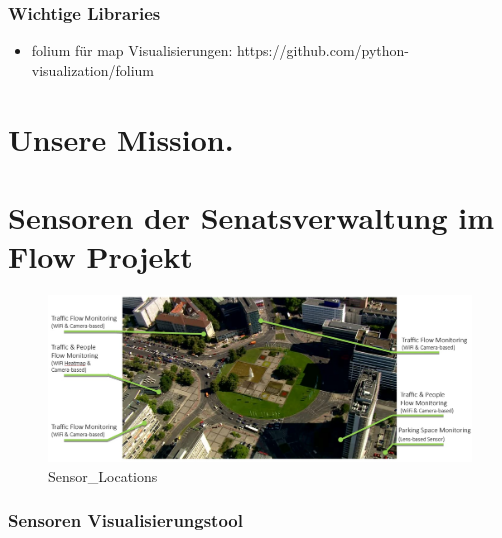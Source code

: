 \documentclass[11pt]{article}
\makeatletter
\def\maxwidth{\ifdim\Gin@nat@width>\linewidth\linewidth
    \else\Gin@nat@width\fi}
\let\Oldincludegraphics\includegraphics
\renewcommand{\includegraphics}[1]{\Oldincludegraphics[width=.8\maxwidth]{#1}}
\providecommand{\tightlist}{%
      \setlength{\itemsep}{0pt}\setlength{\parskip}{0pt}}
\makeatother
\begin{document}
    \subsubsection{Wichtige Libraries}\label{wichtige-libraries}

\begin{itemize}
\tightlist
\item
  folium für map Visualisierungen:
  https://github.com/python-visualization/folium
\end{itemize}

    \section{Unsere Mission.}\label{unsere-mission.}

    \section{Sensoren der Senatsverwaltung im Flow
Projekt}\label{sensoren-der-senatsverwaltung-im-flow-projekt}

\begin{figure}
\centering
\includegraphics{images/Sensor_Locations.jpg}
\caption{Sensor\_Locations}
\end{figure}

    \subsubsection{Sensoren Visualisierungstool
🔮}\label{sensoren-visualisierungstool}
\end{document}
